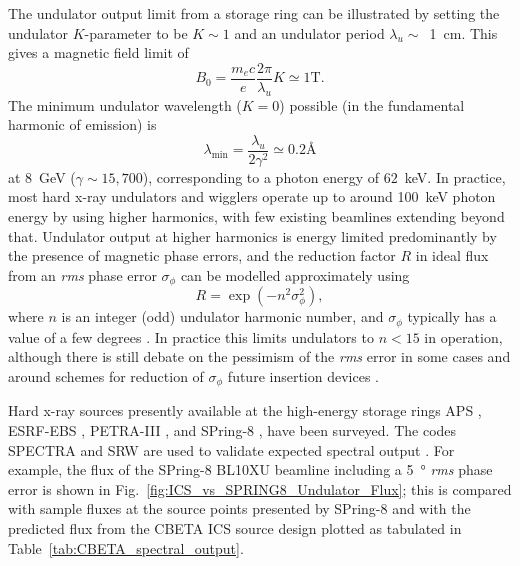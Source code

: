\documentclass[../main.tex]{subfiles}
\begin{document}
The undulator output limit from a storage ring can be illustrated by setting the undulator $K$-parameter to be $K \sim 1$ and an undulator period $\lambda_u \sim$~1~\si{\centi\meter}. This gives a magnetic field limit of
\begin{equation}
B_0 = \frac{m_{e} c}{e}\frac{2\pi}{\lambda_{u}} K \simeq 1\textrm{T}.
\label{eq:undulator_field_limit}
\end{equation}
The minimum undulator wavelength ($K=0$) possible (in the fundamental harmonic of emission) is
\begin{equation}
\lambda_\textrm{min} = \frac{\lambda_{u}}{2 \gamma^2} \simeq 0.2 \textrm{\AA}
\label{eq:undulator_minimum_wavelength}
\end{equation}
at 8~\si{\giga\electronvolt} ($\gamma \sim 15,700$), corresponding to a photon energy of $62$~\si{\kilo\electronvolt}. In practice, most hard x-ray undulators and wigglers operate up to around 100~\si{\kilo\electronvolt} photon energy by using higher harmonics, with few existing beamlines extending beyond that. Undulator output at higher harmonics is energy limited predominantly by the presence of magnetic phase errors, and the reduction factor $R$ in ideal flux from an \textit{rms} phase error $\sigma_{\phi}$ can be modelled approximately \cite{walker1993interference} using 
\begin{equation}
R=\exp{\left(-n^2 \sigma_{\phi}^{2}\right)},
\label{eq:undulator_phase_errors}
\end{equation}
where $n$ is an integer (odd) undulator harmonic number, and $\sigma_\phi$ typically has a value of a few degrees \cite{walker2013phase}. In practice this limits undulators to $n<15$ in operation, although there is still debate on the pessimism of the \textit{rms} error in some cases \cite{tanaka2018universal} and around schemes for reduction of $\sigma_{\phi}$ future insertion devices \cite{hwang2011development,huang2017challenges}.

Hard x-ray sources presently available at the high-energy storage rings APS \cite{apsbeamlines}, ESRF-EBS \cite{esrfbeamlines}, PETRA-III \cite{petraiiibeamlines}, and SPring-8 \cite{spring8beamlines}, have been surveyed. The codes \textsc{SPECTRA} \cite{tanaka2001spectra} and \textsc{SRW} \cite{chubar2013wavefront} are used to validate expected spectral output \cite{tanaka2001field}. For example, the flux of the SPring-8 BL10XU beamline  including a 5~\si{\degree} \textit{rms} phase error is shown in Fig.~\ref{fig:ICS_vs_SPRING8_Undulator_Flux}; this is compared with sample fluxes at the source points presented by SPring-8 \cite{spring8beamlines} and with the predicted flux from the CBETA ICS source design plotted as tabulated in Table~\ref{tab:CBETA_spectral_output}.
\end{document}
